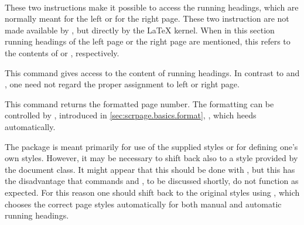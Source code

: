 \begin{Declaration}
  \\
\end{Declaration}%
%
%
These two instructions make it possible to access the running headings, which
are normally meant for the left or for the right page. These two instruction
are not made available by , but directly by the {\LaTeX}
kernel. When in this section running headings of the left page or the right
page are mentioned, this refers to the contents of  or
, respectively.
%
%
%


\begin{Declaration}
\end{Declaration}%
%
This command gives access to the content of running headings.  In
contrast to  and , one need not
regard the proper assignment to left or right page.%
%


\begin{Declaration}
\end{Declaration}%
%
This command returns the formatted page number. The formatting can be
controlled by , introduced in
\autoref{sec:scrpage.basics.format}, ,
which  heeds automatically.%
%


\begin{Declaration}
\end{Declaration}%
The package  is meant primarily for use of the supplied
styles or for defining one's own styles. However, it may be necessary to shift
back also to a style provided by the document class.  It might appear that
this should be done with
, but this has the
disadvantage that commands  and , to be
discussed shortly, do not function as expected.  For this reason one should
shift back to the original styles using
, which chooses
the correct page styles automatically for both manual and automatic running
headings.%
%


